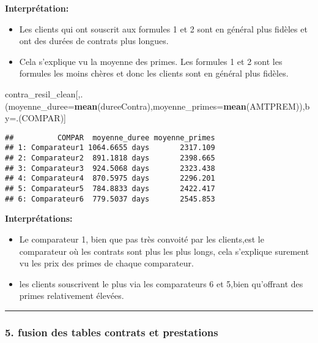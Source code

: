 \documentclass[
]{article}
\newenvironment{Shaded}{\begin{snugshade}}{\end{snugshade}}
\newcommand{\DataTypeTok}[1]{\textcolor[rgb]{0.13,0.29,0.53}{#1}}
\newcommand{\KeywordTok}[1]{\textcolor[rgb]{0.13,0.29,0.53}{\textbf{#1}}}
\newcommand{\NormalTok}[1]{#1}
\begin{document}
\textbf{Interprétation:}

\begin{itemize}
\item
  Les clients qui ont souscrit aux formules 1 et 2 sont en général plus
  fidèles et ont des durées de contrats plus longues.
\item
  Cela s'explique vu la moyenne des primes. Les formules 1 et 2 sont les
  formules les moins chères et donc les clients sont en général plus
  fidèles.
\end{itemize}

\begin{Shaded}
\begin{Highlighting}[]
\NormalTok{contra_resil_clean[,.(}\DataTypeTok{moyenne_duree=}\KeywordTok{mean}\NormalTok{(dureeContra),}\DataTypeTok{moyenne_primes=}\KeywordTok{mean}\NormalTok{(AMTPREM)),by=.(COMPAR)]}
\end{Highlighting}
\end{Shaded}

\begin{verbatim}
##          COMPAR  moyenne_duree moyenne_primes
## 1: Comparateur1 1064.6655 days       2317.109
## 2: Comparateur2  891.1818 days       2398.665
## 3: Comparateur3  924.5068 days       2323.438
## 4: Comparateur4  870.5975 days       2296.201
## 5: Comparateur5  784.8833 days       2422.417
## 6: Comparateur6  779.5037 days       2545.853
\end{verbatim}

\textbf{Interprétations:}

\begin{itemize}
\item
  Le comparateur 1, bien que pas très convoité par les clients,est le
  comparateur où les contrats sont plus les plus longs, cela s'explique
  surement vu les prix des primes de chaque comparateur.
\item
  les clients souscrivent le plus via les comparateurs 6 et 5,bien
  qu'offrant des primes relativement élevées.
\end{itemize}

\begin{center}\rule{0.5\linewidth}{0.5pt}\end{center}

\hypertarget{fusion-des-tables-contrats-et-prestations}{%
\subsubsection{5. fusion des tables contrats et
prestations}\label{fusion-des-tables-contrats-et-prestations}}
\end{document}
